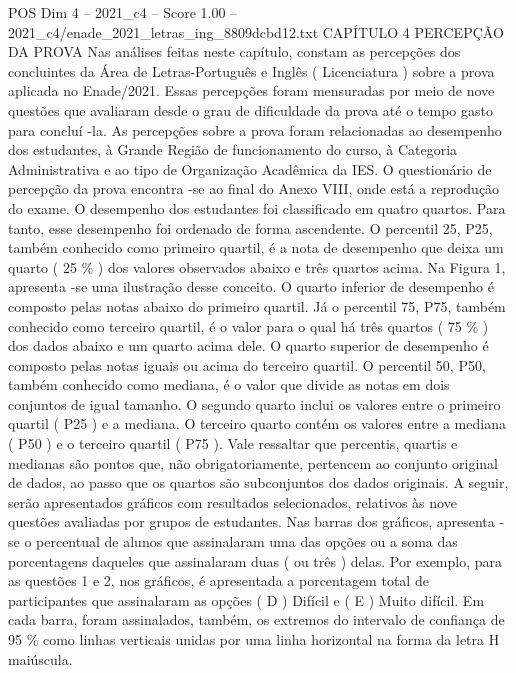 \begin{textsample}{POS Dim 4 – 2021\_c4 – Score 1.00 – 2021\_c4/enade\_2021\_letras\_ing\_8809dcbd12.txt}  \label{ex:f4_pos_139}
CAPÍTULO 4 PERCEPÇÃO DA PROVA Nas análises feitas neste capítulo, constam as percepções dos concluintes da Área de Letras-Português e Inglês ( Licenciatura ) sobre a prova aplicada no Enade/2021.
Essas percepções foram mensuradas por meio de nove questões que avaliaram desde o grau de dificuldade da prova até o tempo gasto para concluí -la.
As percepções sobre a prova foram relacionadas ao desempenho dos estudantes, à Grande Região de funcionamento do curso, à Categoria Administrativa e ao tipo de Organização Acadêmica da IES.
O questionário de percepção da prova encontra -se ao final do Anexo VIII, onde está a reprodução do exame.
O desempenho dos estudantes foi classificado em quatro quartos.
Para tanto, esse desempenho foi ordenado de forma ascendente.
O percentil 25, P25, também conhecido como primeiro quartil, é a nota de desempenho que deixa um quarto ( 25 \% ) dos valores observados abaixo e três quartos acima.
Na Figura 1, apresenta -se uma ilustração desse conceito.
O quarto inferior de desempenho é composto pelas notas abaixo do primeiro quartil.
Já o percentil 75, P75, também conhecido como terceiro quartil, é o valor para o qual há três quartos ( 75 \% ) dos dados abaixo e um quarto acima dele.
O quarto superior de desempenho é composto pelas notas iguais ou acima do terceiro quartil.
O percentil 50, P50, também conhecido como mediana, é o valor que divide as notas em dois conjuntos de igual tamanho.
O segundo quarto inclui os valores entre o primeiro quartil ( P25 ) e a mediana.
O terceiro quarto contém os valores entre a mediana ( P50 ) e o terceiro quartil ( P75 ).
Vale ressaltar que percentis, quartis e medianas são pontos que, não obrigatoriamente, pertencem ao conjunto original de dados, ao passo que os quartos são subconjuntos dos dados originais.
A seguir, serão apresentados gráficos com resultados selecionados, relativos às nove questões avaliadas por grupos de estudantes.
Nas barras dos gráficos, apresenta -se o percentual de alunos que assinalaram uma das opções ou a soma das porcentagens daqueles que assinalaram duas ( ou três ) delas.
Por exemplo, para as questões 1 e 2, nos gráficos, é apresentada a porcentagem total de participantes que assinalaram as opções ( D ) Difícil e ( E ) Muito difícil.
Em cada barra, foram assinalados, também, os extremos do intervalo de confiança de 95 \% como linhas verticais unidas por uma linha horizontal na forma da letra H maiúscula.

\end{textsample}
